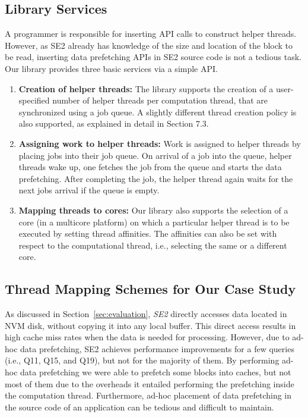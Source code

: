 \subsection{Library Services}
A programmer is responsible for inserting API calls to construct helper threads. However, as SE2 already has knowledge of the size and location of the block to be read, inserting data prefetching APIs in SE2 source code is not a tedious task. Our library provides three basic services via a simple API.

\begin{enumerate}%
 \item \textbf{Creation of helper threads:} The library supports the  creation of a user-specified number of helper threads per computation thread, that are synchronized using a job queue. A slightly different thread creation policy is also supported, as explained in detail in Section 7.3.
 \item \textbf{Assigning work to helper threads:} Work is assigned to helper threads by placing jobs into their job queue. On arrival of a job into the queue, helper threads wake up, one fetches the job from the queue and starts the data prefetching. After completing the job, the helper thread again waits for the next job\textquotesingle s arrival if the queue is empty.
 \item \textbf{Mapping threads to cores:} Our library also supports the selection of a core (in a multicore platform) on which a particular helper thread is to be executed by setting thread affinities. The affinities can also be set with respect to the computational thread, i.e., selecting the same or a different core.
\end{enumerate}

\subsection{Thread Mapping Schemes for Our Case Study}
\label{sec:mapping-schemes}


\noindent As discussed in Section~\ref{sec:evaluation}, \emph{SE2} directly accesses data located in NVM disk, without copying it into any local buffer. This direct access results in high cache miss rates when the data is needed for processing. However, due to ad-hoc data prefetching, SE2 achieves performance improvements for a few queries (i.e., Q11, Q15,  and Q19), but not for the majority of them. By performing ad-hoc data prefetching we were able to prefetch some blocks into caches, but not most of them due to the overheads it entailed performing the prefetching inside the computation thread. Furthermore, ad-hoc placement of data prefetching in the source code of an application can be tedious and difficult to maintain.

